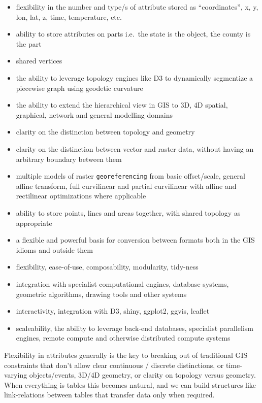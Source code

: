 \documentclass[]{book}
\providecommand{\tightlist}{%
  \setlength{\itemsep}{0pt}\setlength{\parskip}{0pt}}
\theoremstyle{definition}
\theoremstyle{definition}
\theoremstyle{definition}
\theoremstyle{remark}
\begin{document}
\begin{itemize}
\tightlist
\item
  flexibility in the number and type/s of attribute stored as
  ``coordinates'', x, y, lon, lat, z, time, temperature, etc.
\item
  ability to store attributes on parts i.e.~the state is the object, the
  county is the part
\item
  shared vertices
\item
  the ability to leverage topology engines like D3 to dynamically
  segmentize a piecewise graph using geodetic curvature
\item
  the ability to extend the hierarchical view in GIS to 3D, 4D spatial,
  graphical, network and general modelling domains
\item
  clarity on the distinction between topology and geometry
\item
  clarity on the distinction between vector and raster data, without
  having an arbitrary boundary between them
\item
  multiple models of raster \texttt{georeferencing} from basic
  offset/scale, general affine transform, full curvilinear and partial
  curvilinear with affine and rectilinear optimizations where applicable
\item
  ability to store points, lines and areas together, with shared
  topology as appropriate
\item
  a flexible and powerful basis for conversion between formats both in
  the GIS idioms and outside them
\item
  flexibility, ease-of-use, composability, modularity, tidy-ness
\item
  integration with specialist computational engines, database systems,
  geometric algorithms, drawing tools and other systems
\item
  interactivity, integration with D3, shiny, ggplot2, ggvis, leaflet
\item
  scaleability, the ability to leverage back-end databases, specialist
  parallelism engines, remote compute and otherwise distributed compute
  systems
\end{itemize}

Flexibility in attributes generally is the key to breaking out of
traditional GIS constraints that don't allow clear continuous / discrete
distinctions, or time-varying objects/events, 3D/4D geometry, or clarity
on topology versus geometry. When everything is tables this becomes
natural, and we can build structures like link-relations between tables
that transfer data only when required.
\end{document}
